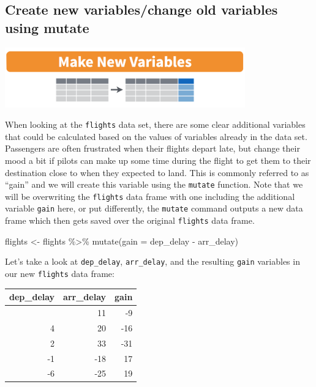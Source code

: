 \documentclass[
  letterpaper,
  DIV=11,
  numbers=noendperiod]{scrartcl}
\newenvironment{Shaded}{\begin{snugshade}}{\end{snugshade}}
\newcommand{\AttributeTok}[1]{\textcolor[rgb]{0.40,0.45,0.13}{#1}}
\newcommand{\FunctionTok}[1]{\textcolor[rgb]{0.28,0.35,0.67}{#1}}
\newcommand{\NormalTok}[1]{\textcolor[rgb]{0.00,0.23,0.31}{#1}}
\newcommand{\OtherTok}[1]{\textcolor[rgb]{0.00,0.23,0.31}{#1}}
\newcommand{\SpecialCharTok}[1]{\textcolor[rgb]{0.37,0.37,0.37}{#1}}
\begin{document}
\subsection{Create new variables/change old variables using
mutate}\label{mutate}

\includegraphics[width=4.08in,height=\textheight]{mutate.png}

When looking at the \texttt{flights} data set, there are some clear
additional variables that could be calculated based on the values of
variables already in the data set. Passengers are often frustrated when
their flights depart late, but change their mood a bit if pilots can
make up some time during the flight to get them to their destination
close to when they expected to land. This is commonly referred to as
``gain'' and we will create this variable using the \texttt{mutate}
function. Note that we will be overwriting the \texttt{flights} data
frame with one including the additional variable \texttt{gain} here, or
put differently, the \texttt{mutate} command outputs a new data frame
which then gets saved over the original \texttt{flights} data frame.

\begin{Shaded}
\begin{Highlighting}[]
\NormalTok{flights }\OtherTok{\textless{}{-}}\NormalTok{ flights }\SpecialCharTok{\%\textgreater{}\%}
  \FunctionTok{mutate}\NormalTok{(}\AttributeTok{gain =}\NormalTok{ dep\_delay }\SpecialCharTok{{-}}\NormalTok{ arr\_delay)}
\end{Highlighting}
\end{Shaded}

Let's take a look at \texttt{dep\_delay}, \texttt{arr\_delay}, and the
resulting \texttt{gain} variables in our new \texttt{flights} data
frame:

\begin{longtable}[]{@{}rrr@{}}
\toprule\noalign{}
dep\_delay & arr\_delay & gain \\
\midrule\noalign{}
\endhead
\bottomrule\noalign{}
\endlastfoot
2 & 11 & -9 \\
4 & 20 & -16 \\
2 & 33 & -31 \\
-1 & -18 & 17 \\
-6 & -25 & 19 \\
\end{longtable}
\end{document}

